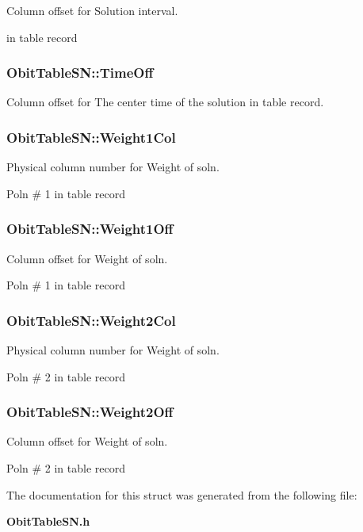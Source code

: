 Column offset for Solution interval. 

in table record 
\subsubsection{ {\bf Obit\-Table\-SN::Time\-Off}}\label{structObitTableSN_o22}


Column offset for The center time of the solution in table record. 

\subsubsection{ {\bf Obit\-Table\-SN::Weight1Col}}\label{structObitTableSN_o49}


Physical column number for Weight of soln. 

Poln \# 1 in table record 
\subsubsection{ {\bf Obit\-Table\-SN::Weight1Off}}\label{structObitTableSN_o48}


Column offset for Weight of soln. 

Poln \# 1 in table record 
\subsubsection{ {\bf Obit\-Table\-SN::Weight2Col}}\label{structObitTableSN_o63}


Physical column number for Weight of soln. 

Poln \# 2 in table record 
\subsubsection{ {\bf Obit\-Table\-SN::Weight2Off}}\label{structObitTableSN_o62}


Column offset for Weight of soln. 

Poln \# 2 in table record 

The documentation for this struct was generated from the following file:\begin{CompactItemize}
\item 
{\bf Obit\-Table\-SN.h}\end{CompactItemize}
